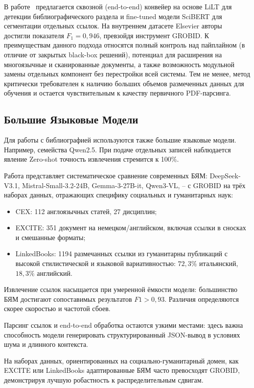 В работе~\cite{joshi2023end} предлагается сквозной (end-to-end) конвейер на основе LiLT для детекции библиографического раздела и fine-tuned модели SciBERT для сегментации отдельных ссылок. На внутреннем датасете Elsevier авторы достигли показателя $F_1 = 0{,}946$, превзойдя инструмент GROBID. К преимуществам данного подхода относятся полный контроль над пайплайном (в отличие от закрытых black-box решений), потенциал для расширения на многоязычные и сканированные документы, а также возможность модульной замены отдельных компонент без перестройки всей системы. Тем не менее, метод критически требователен к наличию больших объемов размеченных данных для обучения и остается чувствительным к качеству первичного PDF-парсинга.

\subsection{Большие Языковые Модели}
Для работы с библиографией используются также большие языковые модели. Например, семейства Qwen2.5. При подаче отдельных записей наблюдается  явление Zero-shot точность извлечения стремится к 100\%.

Работа \cite{zhu2026benchmarking} представляет систематическое сравнение современных БЯМ: DeepSeek-V3.1, Mistral-Small-3.2-24B, Gemma-3-27B-it, Qwen3-VL, -- с GROBID на трёх наборах данных, отражающих специфику социальных и гуманитарных наук: 
\begin{itemize}
    \item CEX: 112 англоязычных статей, 27 дисциплин;
    \item EXCITE: 351 документ на немецком/английском, включая ссылки в сносках и смешанные форматы;
    \item LinkedBooks: 1194 размечанных ссылки из гуманитарны публикаций с высокой стилистической и языковой вариативностью: $72,3\%$ итальянский, $18,3\%$ английский.
\end{itemize}

Извлечение ссылок насыщается при умеренной ёмкости модели: большинство БЯМ достигают сопоставимых результатов $F1 > 0,93$. Различия определяются скорее скоростью и частотой сбоев.

Парсинг ссылок и end-to-end обработка остаются узкими местами: здесь важна способность модели генерировать структурированный JSON-вывод в условиях шума и длинного контекста.

На наборах данных, ориентированных на социально-гуманитарный домен, как EXCITE или LinkedBooks адаптированные БЯМ часто превосходят GROBID, демонстрируя лучшую робастность к распределительным сдвигам.

